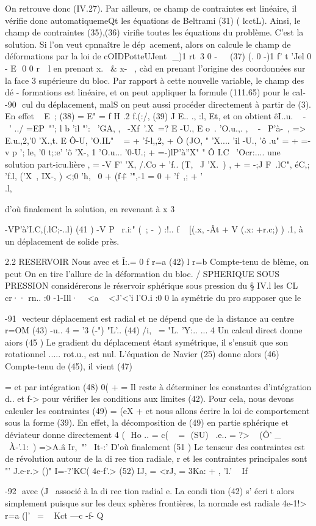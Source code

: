 {{{{On retrouve donc (IV.27). Par ailleurs, ce champ de contraintes est linéaire, 
il vérifie donc automatiquemeQt les équations de Beltrami (31) ( lcctL). Ainsi, le champ de contraintes (35),(36) virifie toutes les équations du pro­blème. C'est la solution. 
Si l'on veut cpnnaître le dép~acement, alors on calcule le champ de déformations par la loi de cOIDPotteUJent 
 
_)1 rt~3 0 
-
~ 

(37) (. 
0 
-)1 f' t 'Jel 0
-
E 

0 0 r~~l 
en prenant x.~ & x-~ , càd en prenant l'origine des coordonnées sur la face
3 supérieure du bloc. Par rapport à cette nouvelle variable, le champ des dé­
-
formations est linéaire, et on peut appliquer la formule (111.65) pour le cal­
-90 ­
cul du déplacement, malS on peut aussi procéder directement à partir de (3). 
En effet 
~
E~; 
(38) 
=
E" 
=
f H 
.2 f.(:/, 
(39) 
J­
E.. ., :l, Et, 
et on obtient 
êI..u. ~ -\ ' ../
=EP~"'; 
l b
'il "':~ 
'GA, , 
~-Xf~'.X\ =? E -U., E
o~. 
'O.u.,. , 
~ -~ P'à-~, => E.u.,2,'0 'X.,t. E 
Ô-U, 
'O.IL" 
~ 
= 
+ 'f-l,,2, +
Ô (JO,
" 'X.... 
'il -U., 'ô .u" = + =-v p ';} le,
'0 t;:e' 'ô 'X-,
1 
'O.u... '0-U.; 
+ =-)lP'à''X"
" 
Ô I.C~ 'Ocr:.... 
une solution part-icu.lière 
, = -V F'} 'X, /.Co + 'f.. (T,~ J 'X.~) 
, 
+
= -;J F~.lC", éC,; 'f.l, ('X~, IX-, ) 
<;0
'h,~ 0 
+ (f\~ + '\'",-1 = 0 
+ %
'f~,; + '\\.l, 

d'où finalement la solution, en revenant à x
3 

-VP'à'I.C,(.lC;-..l) 
(41 ) 
-V P~ r.i:" (~; -~) 
:!.. f ~ [(.x, -Ât + V (.x: +r.c;) ) 
.1, à un déplacement de solide près. 

2.2 RESERVOIR 
Nous avec et
Î:.= 0 
f 
r=a 
(42) 
l 
r=b 
Compte-tenu de blème, on peut 
On en tire l'allure de la déforma­tion du bloc. 
/ 
SPHERIQUE SOUS PRESSION 
considérerons le réservoir sphérique sous pression du § IV.l les CL cr·· rn.. :0 -1-Ill· ~
<a ~ 
<J'<'i l'O.i :0 0 
la symétrie du pro­
supposer que le 


-91 ­
vecteur déplacement est radial et ne dépend que de la distance au centre r=OM 
(43) -u.. 
4 
= '3 (-") "L'.. 
(44) /i,~ = "L. 'Y:.. 
... 4 
Un calcul direct donne aiors 
(45 ) 
Le gradient du déplacement étant symétrique, il s'ensuit que son rotationnel ..... 
rot.u., est nul. L'équation de Navier (25) donne alors 
(46) 
Compte-tenu de (45), il vient 
(47) 


= 
et par intégration 
(48) 	0( +
= 
Il reste à déterminer les constantes d'intégration d.. et f-> pour vérifier les conditions aux limites (42). Pour cela, nous devons calculer les contraintes 
(49) 
= (eX + et nous allons écrire la loi de comportement sous la forme (39). En effet, la décomposition de (49) en partie sphérique et déviateur donne directement 4
(  Ho .. = c( ~
= ­
(SU) 
\ .e.. = ?> ~ (Ô' _~ ~À-'.1:~) =>A.â 
Ir,~"'~ It-:' 
D'où finalement 
(51 ) 
Le tenseur des contraintes est de révolution autour de la di ree tion radiale, 
r
et les contraintes principales sont 
"' J.e-r.> ()" I=-?'KC( 4e-f'.>
(52) 	IJ, = <rJ, = 3Ka: + , ­'l.' ~ If} 
-92 ­
avec (J~ associé à la di rec tion radial e. La condi tion (42) s' écri t alors simplement puisque sur les deux sphères frontières, la normale est radiale 
4e-1!> 
r=a (]'~ = ~ Kct ---c -f-
Q}
